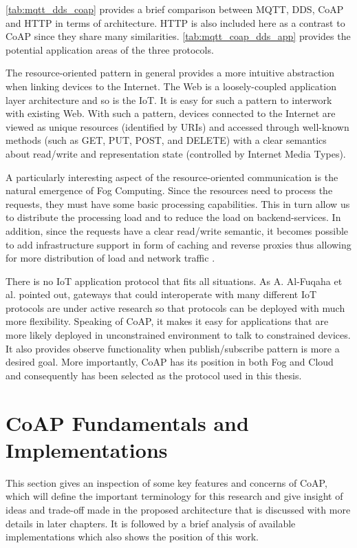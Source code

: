 \autoref{tab:mqtt_dds_coap} provides a brief comparison between MQTT, DDS, CoAP and HTTP in terms of architecture. HTTP is also included here as a contrast to CoAP since they share many similarities. \autoref{tab:mqtt_coap_dds_app} provides the potential application areas of the three protocols.

The resource-oriented pattern in general provides a more intuitive abstraction when linking devices to the Internet. The Web is a loosely-coupled application layer architecture \cite{6159216} and so is the IoT. It is easy for such a pattern to interwork with existing Web. With such a pattern, devices connected to the Internet are viewed as unique resources (identified by URIs) and accessed through well-known methods (such as GET, PUT, POST, and DELETE) with a clear semantics about read/write and representation state (controlled by Internet Media Types). 

A particularly interesting aspect of the resource-oriented communication is the natural emergence of Fog Computing. Since the resources need to process the requests, they must have some basic processing capabilities. This in turn allow us to distribute the processing load and to reduce the load on backend-services. In addition, since the requests have a clear read/write semantic, it becomes possible to add infrastructure support in form of caching and reverse proxies thus allowing for more distribution of load and network traffic \cite{7396558}. 

There is no IoT application protocol that fits all situations. As A. Al-Fuqaha et al. \cite{7123563} pointed out, gateways that could interoperate with many different IoT protocols are under active research so that protocols can be deployed with much more flexibility. Speaking of CoAP, it makes it easy for applications that are more likely deployed in unconstrained environment to talk to constrained devices. It also provides observe functionality when publish/subscribe pattern is more a desired goal. More importantly, CoAP has its position in both Fog and Cloud and consequently has been selected as the protocol used in this thesis.


\section{CoAP Fundamentals and Implementations} \label{CoAP_intro}

This section gives an inspection of some key features and concerns of CoAP, which will define the important terminology for this research and give insight of ideas and trade-off made in the proposed architecture that is discussed with more details in later chapters. It is followed by a brief analysis of available implementations which also shows the position of this work. 

